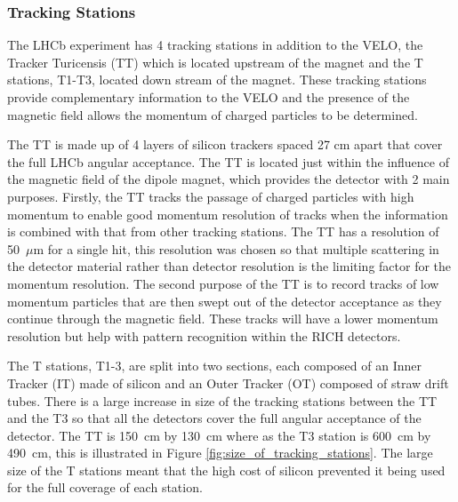 


\subsubsection{Tracking Stations} 
\label{Tracking_Stations}
The LHCb experiment has 4 tracking stations in addition to the VELO, the Tracker Turicensis (TT) which is located upstream of the magnet and the T stations, T1-T3, located down stream of the magnet. These tracking stations provide complementary information to the VELO and the presence of the magnetic field allows the momentum of charged particles to be determined. 



The TT is made up of 4 layers of silicon trackers spaced 27 cm apart that cover the full LHCb angular acceptance. The TT is located just within the influence of the magnetic field of the dipole magnet, which provides the detector with 2 main purposes. Firstly, the TT tracks the passage of charged particles with high momentum to enable good momentum resolution of tracks when the information is combined with that from other tracking stations. The TT has a resolution of 50~$\mu$m for a single hit, this resolution was chosen so that multiple scattering in the detector material rather than detector resolution is the limiting factor for the momentum resolution. The second purpose of the TT is to record tracks of low momentum particles that are then swept out of the detector acceptance as they continue through the magnetic field. These tracks will have a lower momentum resolution but help with pattern recognition within the RICH detectors. 


The T stations, T1-3, are split into two sections, each composed of an Inner Tracker (IT) made of silicon and an Outer Tracker (OT) composed of straw drift tubes. 
There is a large increase in size of the tracking stations between the TT and the T3 so that all the detectors cover the full angular acceptance of the detector. The TT is 150~cm by 130~cm where as the T3 station is 600~cm by 490~cm, this is illustrated in Figure \ref{fig:size_of_tracking_stations}. The large size of the T stations meant that the high cost of silicon prevented it being used for the full coverage of each station.

